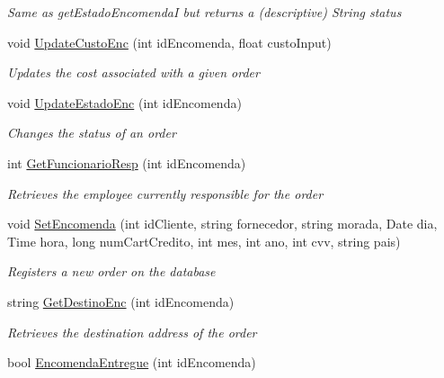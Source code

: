 \begin{DoxyCompactItemize}
\begin{DoxyCompactList}\small\item\em Same as get\+Estado\+EncomendaI but returns a (descriptive) String status \end{DoxyCompactList}\item 
void \mbox{\hyperlink{classmvc_j_j_m_s_1_1_controllers_1_1_encomenda_controller_a9f2e8359f35f8d5e737c3a1d9ff7b1c1}{Update\+Custo\+Enc}} (int id\+Encomenda, float custo\+Input)
\begin{DoxyCompactList}\small\item\em Updates the cost associated with a given order \end{DoxyCompactList}\item 
void \mbox{\hyperlink{classmvc_j_j_m_s_1_1_controllers_1_1_encomenda_controller_a36abeee72b22518276b9af3d4b7ed48f}{Update\+Estado\+Enc}} (int id\+Encomenda)
\begin{DoxyCompactList}\small\item\em Changes the status of an order \end{DoxyCompactList}\item 
int \mbox{\hyperlink{classmvc_j_j_m_s_1_1_controllers_1_1_encomenda_controller_a29d51d82112bcd56e12b4c2ae5220f43}{Get\+Funcionario\+Resp}} (int id\+Encomenda)
\begin{DoxyCompactList}\small\item\em Retrieves the employee currently responsible for the order \end{DoxyCompactList}\item 
void \mbox{\hyperlink{classmvc_j_j_m_s_1_1_controllers_1_1_encomenda_controller_a88efec95120dea4ca5b3ad0e6add6abe}{Set\+Encomenda}} (int id\+Cliente, string fornecedor, string morada, Date dia, Time hora, long num\+Cart\+Credito, int mes, int ano, int cvv, string pais)
\begin{DoxyCompactList}\small\item\em Registers a new order on the database \end{DoxyCompactList}\item 
string \mbox{\hyperlink{classmvc_j_j_m_s_1_1_controllers_1_1_encomenda_controller_a17045273a7db6110840c352ccf2942f2}{Get\+Destino\+Enc}} (int id\+Encomenda)
\begin{DoxyCompactList}\small\item\em Retrieves the destination address of the order \end{DoxyCompactList}\item 
bool \mbox{\hyperlink{classmvc_j_j_m_s_1_1_controllers_1_1_encomenda_controller_a7aa095cf3c1afa66cb3b53cf58d0973d}{Encomenda\+Entregue}} (int id\+Encomenda)

\end{DoxyCompactItemize}

